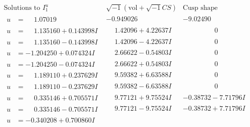 \documentclass[1p]{elsarticle_modified}
\theoremstyle{definition}
\newcommand{\I}{\sqrt{-1}}
\begin{document}
$$\begin{array}{c|c|c}  
\text{Solutions to }I^u_{1}& \I (\text{vol} + \sqrt{-1}CS) & \text{Cusp shape}\\
 \hline 
\begin{aligned}
u &= \phantom{-}1.07019\phantom{ +0.000000I}\end{aligned}
 & -0.949026\phantom{ +0.000000I} & -9.02490\phantom{ +0.000000I} \\ \hline\begin{aligned}
u &= \phantom{-}1.135160 + 0.143998 I\end{aligned}
 & \phantom{-}1.42096 + 4.22637 I & \phantom{-0.000000 } 0 \\ \hline\begin{aligned}
u &= \phantom{-}1.135160 - 0.143998 I\end{aligned}
 & \phantom{-}1.42096 - 4.22637 I & \phantom{-0.000000 } 0 \\ \hline\begin{aligned}
u &= -1.204250 + 0.074324 I\end{aligned}
 & \phantom{-}2.66622 - 0.54803 I & \phantom{-0.000000 } 0 \\ \hline\begin{aligned}
u &= -1.204250 - 0.074324 I\end{aligned}
 & \phantom{-}2.66622 + 0.54803 I & \phantom{-0.000000 } 0 \\ \hline\begin{aligned}
u &= \phantom{-}1.189110 + 0.237629 I\end{aligned}
 & \phantom{-}9.59382 + 6.63588 I & \phantom{-0.000000 } 0 \\ \hline\begin{aligned}
u &= \phantom{-}1.189110 - 0.237629 I\end{aligned}
 & \phantom{-}9.59382 - 6.63588 I & \phantom{-0.000000 } 0 \\ \hline\begin{aligned}
u &= \phantom{-}0.335146 + 0.705571 I\end{aligned}
 & \phantom{-}9.77121 + 9.75524 I & -0.38732 - 7.71796 I \\ \hline\begin{aligned}
u &= \phantom{-}0.335146 - 0.705571 I\end{aligned}
 & \phantom{-}9.77121 - 9.75524 I & -0.38732 + 7.71796 I \\ \hline\begin{aligned}
u &= -0.340208 + 0.700860 I\end{aligned}

\end{array}$$
\end{document}
